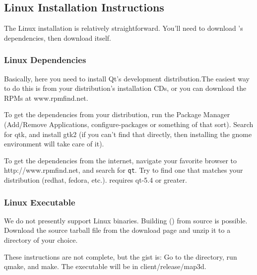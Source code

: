 \subsection{Linux Installation Instructions}
\label{sec:linux-install}

The Linux installation is relatively straightforward.  You'll need to 
download \map{}'s dependencies, then download \map{} itself.

\subsubsection{Linux Dependencies}

Basically, here you need to install Qt's development distribution.The easiest way to do this is from your distribution's 
installation CDs, or you can download the RPMs at www.rpmfind.net.  

To get the dependencies from your distribution, run the Package Manager
(Add/Remove Applications, configure-packages or something of that sort).
Search for qtk, and install gtk2 (if you can't find that directly, then 
installing the gnome environment will take care of it).

To get the dependencies from the internet, navigate your favorite browser
to  {http://www.rpmfind.net}, and
search for \texttt{qt}.  Try to find one that matches your
distribution (redhat, fedora, etc.). \map{} requires qt-5.4 or greater.

\subsubsection{Linux Executable}

We do not presently support Linux binaries.  Building \map() from source
is possible.  Download the \map{} source tarball file from the \map{} download page
and unzip it to a directory of your choice.

These instructions are not complete, but the gist is: Go to the \map{} directory, run qmake, and make.
The \map{} executable will be in client/release/map3d.

